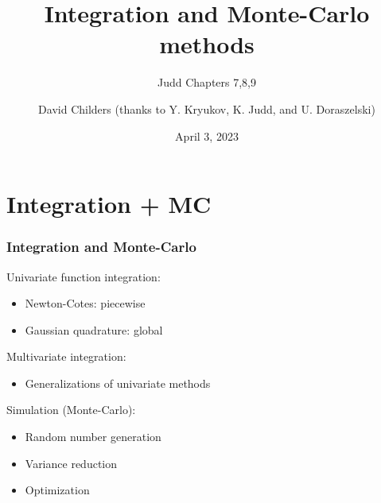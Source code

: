 \documentclass[bigger,handout]{beamer}
\begin{document}
\title[47-809: Integration \& MC]{Integration and Monte-Carlo methods}
\subtitle{Judd Chapters 7,8,9}
\author[David Childers]{David Childers (thanks to Y. Kryukov, K. Judd, and U. Doraszelski)}
\date[Apr 3]{April 3, 2023}
\maketitle

\section{Integration + MC}

\begin{frame}%
\frametitle{Integration and Monte-Carlo}

Univariate function integration:

\begin{itemize}
\item Newton-Cotes: piecewise

\item Gaussian quadrature: global
\end{itemize}

Multivariate integration:

\begin{itemize}
\item Generalizations of univariate methods
\end{itemize}

Simulation (Monte-Carlo):

\begin{itemize}
\item Random number generation

\item Variance reduction

\item Optimization
\end{itemize}

\end{frame}%
\end{document}
